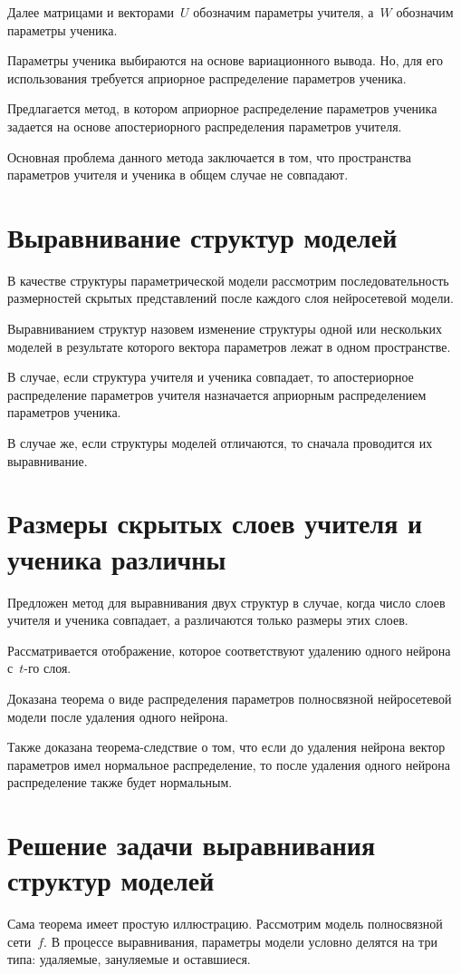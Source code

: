 \documentclass[10pt, twoside]{article}
\begin{document}
Далее матрицами и векторами~$U$ обозначим параметры учителя, а~$W$ обозначим параметры ученика.

Параметры ученика выбираются на основе вариационного вывода. Но, для его использования требуется априорное распределение параметров ученика.

Предлагается метод, в котором априорное распределение параметров ученика задается на основе апостериорного распределения параметров учителя.

Основная проблема данного метода заключается в том, что пространства параметров учителя и ученика в общем случае не совпадают.

\section{Выравнивание структур моделей}
В качестве структуры параметрической модели рассмотрим последовательность размерностей скрытых представлений после каждого слоя нейросетевой модели.

Выравниванием структур назовем изменение структуры одной или нескольких моделей в результате которого вектора параметров лежат в одном пространстве.

В случае, если структура учителя и ученика совпадает, то апостериорное распределение параметров учителя назначается априорным распределением параметров ученика.

В случае же, если структуры моделей отличаются, то сначала проводится их выравнивание.

\section{Размеры скрытых слоев учителя и ученика различны}
Предложен метод для выравнивания двух структур в случае, когда число слоев учителя и ученика совпадает, а различаются только размеры этих слоев.

Рассматривается отображение, которое соответствуют удалению одного нейрона с~$t$-го слоя.

Доказана теорема о виде распределения параметров полносвязной нейросетевой модели после удаления одного нейрона.

Также доказана теорема-следствие о том, что если до удаления нейрона вектор параметров имел нормальное распределение, то после удаления одного нейрона распределение также будет нормальным.

\section{Решение задачи выравнивания структур моделей}
Сама теорема имеет простую иллюстрацию. Рассмотрим модель полносвязной сети~$f$. В процессе выравнивания, параметры модели условно делятся на три типа: удаляемые, зануляемые и оставшиеся.
\end{document}
